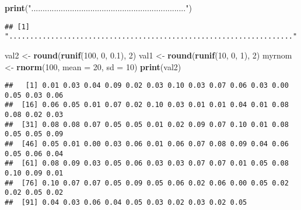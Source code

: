 \documentclass[
]{article}
\newenvironment{Shaded}{\begin{snugshade}}{\end{snugshade}}
\newcommand{\AttributeTok}[1]{\textcolor[rgb]{0.13,0.29,0.53}{#1}}
\newcommand{\DecValTok}[1]{\textcolor[rgb]{0.00,0.00,0.81}{#1}}
\newcommand{\FloatTok}[1]{\textcolor[rgb]{0.00,0.00,0.81}{#1}}
\newcommand{\FunctionTok}[1]{\textcolor[rgb]{0.13,0.29,0.53}{\textbf{#1}}}
\newcommand{\NormalTok}[1]{#1}
\newcommand{\OtherTok}[1]{\textcolor[rgb]{0.56,0.35,0.01}{#1}}
\newcommand{\StringTok}[1]{\textcolor[rgb]{0.31,0.60,0.02}{#1}}
\begin{document}
\begin{Shaded}
\begin{Highlighting}[]
\FunctionTok{print}\NormalTok{(}\StringTok{"...................................................................."}\NormalTok{)}
\end{Highlighting}
\end{Shaded}

\begin{verbatim}
## [1] "...................................................................."
\end{verbatim}

\begin{Shaded}
\begin{Highlighting}[]
\NormalTok{val2 }\OtherTok{\textless{}{-}} \FunctionTok{round}\NormalTok{(}\FunctionTok{runif}\NormalTok{(}\DecValTok{100}\NormalTok{, }\DecValTok{0}\NormalTok{, }\FloatTok{0.1}\NormalTok{), }\DecValTok{2}\NormalTok{)}
\NormalTok{val1 }\OtherTok{\textless{}{-}} \FunctionTok{round}\NormalTok{(}\FunctionTok{runif}\NormalTok{(}\DecValTok{10}\NormalTok{, }\DecValTok{0}\NormalTok{, }\DecValTok{1}\NormalTok{), }\DecValTok{2}\NormalTok{)}
\NormalTok{myrnom }\OtherTok{\textless{}{-}} \FunctionTok{rnorm}\NormalTok{(}\DecValTok{100}\NormalTok{, }\AttributeTok{mean =} \DecValTok{20}\NormalTok{, }\AttributeTok{sd =} \DecValTok{10}\NormalTok{)}
\FunctionTok{print}\NormalTok{(val2)}
\end{Highlighting}
\end{Shaded}

\begin{verbatim}
##   [1] 0.01 0.03 0.04 0.09 0.02 0.03 0.10 0.03 0.07 0.06 0.03 0.00 0.05 0.03 0.06
##  [16] 0.06 0.05 0.01 0.07 0.02 0.10 0.03 0.01 0.01 0.04 0.01 0.08 0.08 0.02 0.03
##  [31] 0.08 0.08 0.07 0.05 0.05 0.01 0.02 0.09 0.07 0.10 0.01 0.08 0.05 0.05 0.09
##  [46] 0.05 0.01 0.00 0.03 0.06 0.01 0.06 0.07 0.08 0.09 0.04 0.06 0.05 0.06 0.04
##  [61] 0.08 0.09 0.03 0.05 0.06 0.03 0.03 0.07 0.07 0.01 0.05 0.08 0.10 0.09 0.01
##  [76] 0.10 0.07 0.07 0.05 0.09 0.05 0.06 0.02 0.06 0.00 0.05 0.02 0.02 0.05 0.02
##  [91] 0.04 0.03 0.06 0.04 0.05 0.03 0.02 0.03 0.02 0.05
\end{verbatim}
\end{document}

